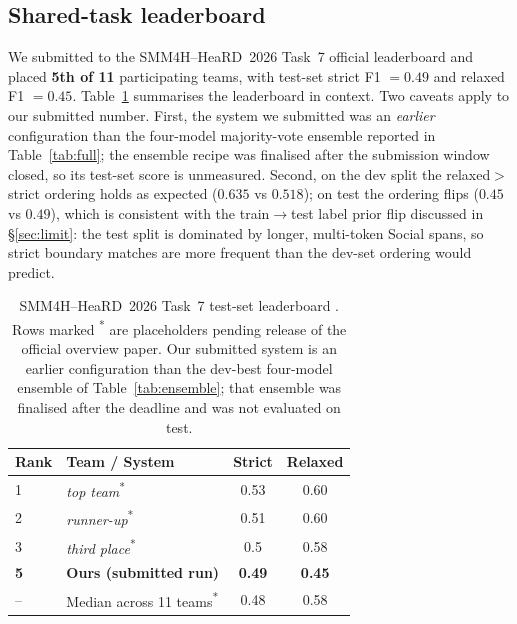 \documentclass[11pt]{article}
\begin{document}
\subsection{Shared-task leaderboard}
\label{sec:leaderboard}

We submitted to the SMM4H--HeaRD~2026 Task~7 official leaderboard
\citep{smm4h-heard-overview-2026} and placed \textbf{5th of 11}
participating teams, with test-set strict F1 $= 0.49$ and relaxed F1
$= 0.45$. Table~\ref{tab:leaderboard} summarises the leaderboard in
context. Two caveats apply to our submitted number.
First, the system we submitted was an \emph{earlier} configuration than
the four-model majority-vote ensemble reported in Table~\ref{tab:full};
the ensemble recipe was finalised after the submission window closed,
so its test-set score is unmeasured. Second, on the dev split the
relaxed$>$strict ordering holds as expected ($0.635$ vs $0.518$); on
test the ordering flips ($0.45$ vs $0.49$), which is consistent with
the train$\to$test label prior flip discussed in \S\ref{sec:limit}:
the test split is dominated by longer, multi-token Social spans, so
strict boundary matches are more frequent than the dev-set ordering
would predict.

\begin{table}[t]
\centering\small
\setlength{\tabcolsep}{5pt}
\begin{tabular}{llcc}
\toprule
Rank & Team / System & Strict & Relaxed \\
\midrule
1 & \textit{top team}\textsuperscript{*} & 0.53 & 0.60 \\
2 & \textit{runner-up}\textsuperscript{*} & 0.51 & 0.60 \\
3 & \textit{third place}\textsuperscript{*} & 0.5 & 0.58 \\
\midrule
\textbf{5} & \textbf{Ours (submitted run)} & \textbf{0.49} & \textbf{0.45} \\
-- & Median across 11 teams\textsuperscript{*} & 0.48 & 0.58 \\
\bottomrule
\end{tabular}
\caption{SMM4H--HeaRD~2026 Task~7 test-set leaderboard
\citep{smm4h-heard-overview-2026}. Rows marked
\textsuperscript{*} are placeholders pending release of the official
overview paper. Our submitted system is an earlier configuration than
the dev-best four-model ensemble of Table~\ref{tab:ensemble}; that
ensemble was finalised after the deadline and was not evaluated on test.}
\label{tab:leaderboard}
\end{table}
\end{document}
